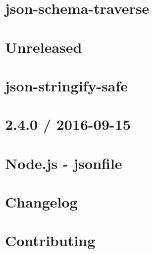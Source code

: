 \documentclass[twoside]{book}
\newcommand{\+}{\discretionary{\mbox{\scriptsize$\hookleftarrow$}}{}{}}
\begin{document}
\chapter{json-\/schema-\/traverse}
\label{md_dsmacc_vis_degree_node_modules_json-schema-traverse_README}

\chapter{Unreleased}
\label{md_dsmacc_vis_degree_node_modules_json-stringify-safe_CHANGELOG}

\chapter{json-\/stringify-\/safe}
\label{md_dsmacc_vis_degree_node_modules_json-stringify-safe_README}

\chapter{2.4.0 / 2016-\/09-\/15}
\label{md_dsmacc_vis_degree_node_modules_jsonfile_CHANGELOG}

\chapter{Node.\+js -\/ jsonfile}
\label{md_dsmacc_vis_degree_node_modules_jsonfile_README}

\chapter{Changelog}
\label{md_dsmacc_vis_degree_node_modules_jsprim_CHANGES}

\chapter{Contributing}
\label{md_dsmacc_vis_degree_node_modules_jsprim_CONTRIBUTING}

\end{document}
